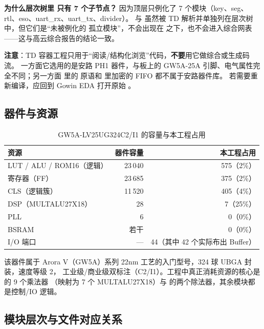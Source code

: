 \begin{tipbox}
\textbf{为什么层次树里  只有 7 个子节点？}
因为顶层只例化了 7 个模块（key、seg、rtl、eso、uart\_rx、uart\_tx、divider）。
 与  虽然被 TD 解析并单独列在层次树中，但它们是“未被例化的
孤立模块”，不会出现在  之下，也不会进入综合网表——这与高云综合报告的结论一致。
\end{tipbox}

\begin{warnbox}
\textbf{注意}：TD 容器工程只用于“阅读/结构化浏览”代码，\textbf{不要}用它做综合或生成码流。
一方面它选用的是安路 PH1 器件，与板上的 GW5A-25A 引脚、电气属性完全不同；另一方面
 里的  原语和  里加密的 FIFO 都不属于安路器件库。
若需要重新编译，应回到 Gowin EDA 打开原始 。
\end{warnbox}

\subsection{器件与资源}

\begin{table}[htbp]
\centering
\small
\caption{GW5A-LV25UG324C2/I1 的容量与本工程占用}
\begin{tabular}{lrr}
\toprule
资源 & 器件容量 & 本工程占用\\
\midrule
LUT / ALU / ROM16（逻辑） & 23\,040 & 575（2\%）\\
寄存器（FF） & 23\,685 & 375（2\%）\\
CLS（逻辑簇） & 11\,520 & 405（4\%）\\
DSP（MULTALU27X18） & 28 & 7（25\%）\\
PLL & 6 & 0（0\%）\\
BSRAM & 若干 & 0（0\%）\\
I/O 端口 & — & 44（其中 42 个实际布出 Buffer）\\
\bottomrule
\end{tabular}
\end{table}

该器件属于 Arora V（GW5A）系列 22nm 工艺的入门型号，324 球 UBGA 封装，速度等级 2，
工业级/商业级双标注（C2/I1）。工程中真正消耗资源的核心是  的 9 个乘法器
（映射为 7 个 MULTALU27X18）与  的两个除法器，其余模块都是控制/IO 逻辑。

\subsection{模块层次与文件对应关系}

